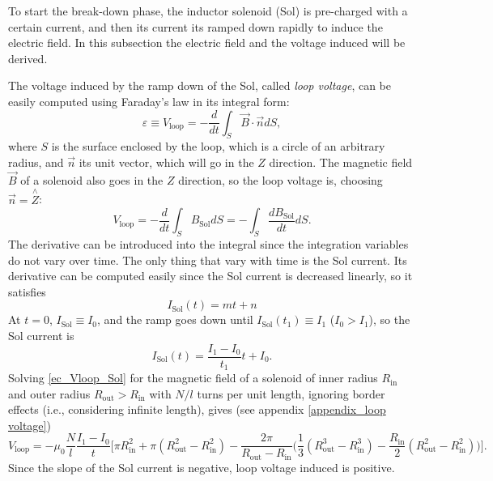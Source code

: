 \documentclass[a4paper,12pt,oneside]{book}
\begin{document}
To start the break-down phase, the inductor solenoid (Sol) is pre-charged with a certain current, and then its current its ramped down rapidly to induce the electric field. In this subsection the electric field and the voltage induced will be derived.


The voltage induced by the ramp down of the Sol, called \textit{loop voltage}, can be easily computed using Faraday's law in its integral form:
%
\begin{equation}\label{ec_Faraday_loop}
\varepsilon \equiv V_\text{loop} = -\dfrac{d}{dt} \int_S \vec{B} \cdot \vec{n} dS,
\end{equation}
where $S$ is the surface enclosed by the loop, which is a circle of an arbitrary radius, and $\vec{n}$ its unit vector, which will go in the $Z$ direction. The magnetic field $\vec{B}$ of a solenoid also goes in the $Z$ direction, so the loop voltage is, choosing $\vec{n}=\stackrel{\wedge}{Z}$:
%
\begin{equation}\label{ec_Vloop_Sol}
V_\text{loop} = - \dfrac{d}{dt} \int_S B_\text{Sol} dS= - \int_S \dfrac{d B_\text{Sol}}{dt} dS.
\end{equation}
The derivative can be introduced into the integral since the integration variables do not vary over time. The only thing that vary with time is the Sol current. Its derivative can be computed easily since the Sol current is decreased linearly, so it satisfies
%
\begin{equation}
I_\text{Sol}(t)=m t +n
\end{equation}
At $t=0$, $I_\text{Sol} \equiv I_0$, and the ramp goes down until $I_\text{Sol}(t_1) \equiv  I_1$ ($I_0>I_1$), so the Sol current is
%
\begin{equation}
I_\text{Sol}(t)=\dfrac{I_1-I_0}{t_1} t +I_0.
\end{equation}
Solving \eqref{ec_Vloop_Sol} for the magnetic field of a solenoid of inner radius $R_\text{in}$ and outer radius $R_\text{out}>R_\text{in}$ with $N/l$ turns per unit length, ignoring border effects (i.e., considering infinite length), gives (see appendix \ref{appendix_loop voltage})
\begin{equation}
V_\text{loop}= - \mu_0 \dfrac{N}{l} \dfrac{I_1-I_0}{t} \Big[ \pi R_\text{in}^2  + \pi (R_\text{out}^2-R_\text{in}^2) - \dfrac{2 \pi}{R_\text{out}-R_\text{in}} \Big( \dfrac{1}{3} (R_\text{out}^3-R_\text{in}^3) - \dfrac{R_\text{in}}{2} (R_\text{out}^2-R_\text{in}^2) \Big) \Big].
\end{equation}
Since the slope of the Sol current is negative, loop voltage induced is positive.
\end{document}
